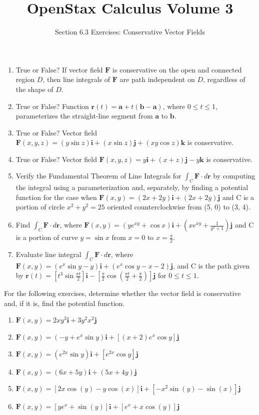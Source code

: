 \documentclass{exercises}
\title{OpenStax Calculus Volume 3}
\subtitle{Section 6.3 Exercises: Conservative Vector Fields}
\author{}
\date{}
\begin{document}
\maketitle

\begin{enumerate}[start=1]
\item True or False? If vector field $\mathbf{F}$ is conservative on the open and connected region $D$, then line integrals of $\mathbf{F}$ are path independent on $D$, regardless of the shape of $D$.
\item True or False? Function $\mathbf{r}(t)=\mathbf{a}+t(\mathbf{b}-\mathbf{a})$, where $0\le t\le1$, parameterizes the straight-line segment from $\mathbf{a}$ to $\mathbf{b}$.
\item True or False? Vector field $\mathbf{F}(x,y,z)=(y\sin z)\mathbf{i}+(x\sin z)\mathbf{j}+(xy\cos z)\mathbf{k}$ is conservative.
\item True or False? Vector field $\mathbf{F}(x,y,z)=y\mathbf{i}+(x+z)\mathbf{j}-y\mathbf{k}$ is conservative.
\item Verify the Fundamental Theorem of Line Integrals for $\int_{C}\mathbf{F}\cdot d\mathbf{r}$ by computing the integral using a parameterization and, separately, by finding a potential function for the case when $\mathbf{F}(x,y)=(2x+2y)\mathbf{i}+(2x+2y)\mathbf{j}$ and C is a portion of circle $x^{2}+y^{2}=25$ oriented counterclockwise from (5, 0) to (3, 4).
\item \techrequired Find $\int_{C}\mathbf{F}\cdot d\mathbf{r}$, where $\mathbf{F}(x,y)=(ye^{xy}+\cos x)\mathbf{i}+(xe^{xy}+\frac{1}{y^{2}+1})\mathbf{j}$ and C is a portion of curve $y=\sin x$ from $x=0$ to $x=\frac{\pi}{2}$.
\item \techrequired Evaluate line integral $\int_{C}\mathbf{F}\cdot d\mathbf{r}$, where $\mathbf{F}(x,y)=(e^{x}\sin y-y)\mathbf{i}+(e^{x}\cos y-x-2)\mathbf{j}$, and C is the path given by $\mathbf{r}(t)=[t^{3}\sin \frac{\pi t}{2}]\mathbf{i}-[\frac{\pi}{2}\cos(\frac{\pi t}{2}+\frac{\pi}{2})]\mathbf{j}$ for $0\le t\le1$.
\end{enumerate}

For the following exercises, determine whether the vector field is conservative and, if it is, find the potential function.

\begin{enumerate}[resume]
\item $\mathbf{F}(x,y)=2xy^{3}\mathbf{i}+3y^{2}x^{2}\mathbf{j}$
\item $\mathbf{F}(x,y)=(-y+e^{x}\sin y)\mathbf{i}+[(x+2)e^{x}\cos y]\mathbf{j}$
\item $\mathbf{F}(x,y)=(e^{2x}\sin y)\mathbf{i}+[e^{2x}\cos y]\mathbf{j}$
\item $\mathbf{F}(x,y)=(6x+5y)\mathbf{i}+(5x+4y)\mathbf{j}$
\item $\mathbf{F}(x,y)=[2x\cos(y)-y\cos(x)]\mathbf{i}+[-x^{2}\sin(y)-\sin(x)]\mathbf{j}$
\item $\mathbf{F}(x,y)=[ye^{x}+\sin(y)]\mathbf{i}+[e^{x}+x\cos(y)]\mathbf{j}$
\end{enumerate}
\end{document}
